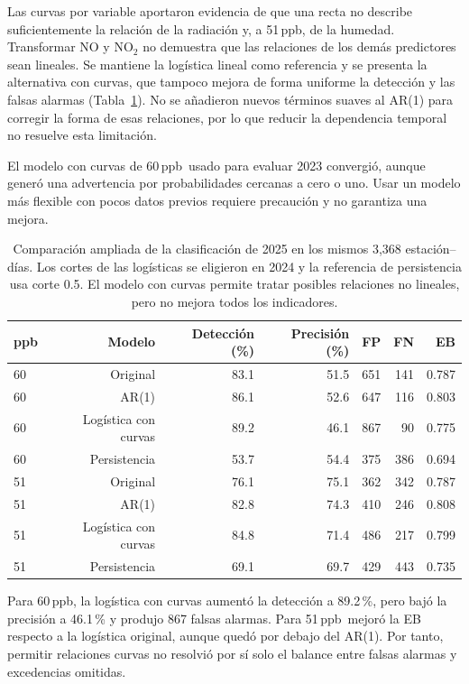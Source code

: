 \documentclass[11pt,letterpaper]{article}
\newcommand{\ppb}{\,ppb}
\newenvironment{cambio}{}{}
\begin{document}
\begin{cambio}
Las curvas por variable aportaron evidencia de que una recta no describe suficientemente la relación de la radiación y, a 51\ppb, de la humedad. Transformar NO y NO$_2$ no demuestra que las relaciones de los demás predictores sean lineales. Se mantiene la logística lineal como referencia y se presenta la alternativa con curvas, que tampoco mejora de forma uniforme la detección y las falsas alarmas (Tabla~\ref{tab:comparacion_ampliada}). No se añadieron nuevos términos suaves al AR(1) para corregir la forma de esas relaciones, por lo que reducir la dependencia temporal no resuelve esta limitación.

El modelo con curvas de 60\ppb\ usado para evaluar 2023 convergió, aunque generó una advertencia por probabilidades cercanas a cero o uno. Usar un modelo más flexible con pocos datos previos requiere precaución y no garantiza una mejora.
\end{cambio}
\begin{table}[H]
\begin{cambio}\centering\small
\begin{tabular}{@{}lrrrrrr@{}}\toprule
ppb & Modelo & Detección (\%) & Precisión (\%) & FP & FN & EB\\\midrule
60 & Original & 83.1 & 51.5 & 651 & 141 & 0.787\\
60 & AR(1) & 86.1 & 52.6 & 647 & 116 & 0.803\\
60 & Logística con curvas & 89.2 & 46.1 & 867 & 90 & 0.775\\
60 & Persistencia & 53.7 & 54.4 & 375 & 386 & 0.694\\
51 & Original & 76.1 & 75.1 & 362 & 342 & 0.787\\
51 & AR(1) & 82.8 & 74.3 & 410 & 246 & 0.808\\
51 & Logística con curvas & 84.8 & 71.4 & 486 & 217 & 0.799\\
51 & Persistencia & 69.1 & 69.7 & 429 & 443 & 0.735\\
\bottomrule\end{tabular}
\caption{Comparación ampliada de la clasificación de 2025 en los mismos 3,368 estación--días. Los cortes de las logísticas se eligieron en 2024 y la referencia de persistencia usa corte 0.5. El modelo con curvas permite tratar posibles relaciones no lineales, pero no mejora todos los indicadores.}\label{tab:comparacion_ampliada}
\end{cambio}
\end{table}
\begin{cambio}
Para 60\ppb, la logística con curvas aumentó la detección a 89.2\,\%, pero bajó la precisión a 46.1\,\% y produjo 867 falsas alarmas. Para 51\ppb\ mejoró la EB respecto a la logística original, aunque quedó por debajo del AR(1). Por tanto, permitir relaciones curvas no resolvió por sí solo el balance entre falsas alarmas y excedencias omitidas.
\end{cambio}
\end{document}

